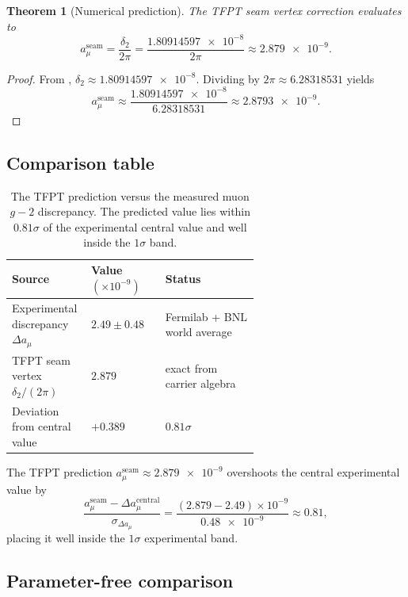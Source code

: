 \documentclass[11pt,a4paper]{article}
\newtheorem{theorem}{Theorem}[section]
\theoremstyle{definition}
\theoremstyle{remark}
\numberwithin{equation}{section}
\begin{document}
\begin{theorem}[Numerical prediction]\label{thm:numerical-prediction}
The TFPT seam vertex correction evaluates to
\begin{equation}\label{eq:numerical-prediction}
a_\mu^{\mathrm{seam}}
=
\frac{\delta_2}{2\pi}
=
\frac{\num{1.80914597e-8}}{2\pi}
\approx
\num{2.879e-9}.
\end{equation}
\end{theorem}

\begin{proof}
From , $\delta_2\approx\num{1.80914597e-8}$.
Dividing by $2\pi\approx\num{6.28318531}$ yields
\[
a_\mu^{\mathrm{seam}}
\approx
\frac{\num{1.80914597e-8}}{\num{6.28318531}}
\approx
\num{2.8793e-9}.
\]
\end{proof}

\subsection{Comparison table}

\begin{table}[ht]
\centering
\begin{tabularx}{\linewidth}{@{}>{\raggedright\arraybackslash}p{0.32\linewidth}
    >{\centering\arraybackslash}p{0.30\linewidth}
    >{\centering\arraybackslash}X@{}}
\toprule
Source & Value $(\times10^{-9})$ & Status \\
\midrule
Experimental discrepancy $\Delta a_\mu$ & $2.49\pm0.48$ & Fermilab + BNL world average \\
TFPT seam vertex $\delta_2/(2\pi)$ & $2.879$ & exact from carrier algebra \\
\midrule
Deviation from central value & $+0.389$ & $0.81\sigma$ \\
\bottomrule
\end{tabularx}
\caption{The TFPT prediction versus the measured muon $g-2$ discrepancy. The
predicted value lies within $0.81\sigma$ of the experimental central value and
well inside the $1\sigma$ band.}
\label{tab:comparison}
\end{table}

The TFPT prediction $a_\mu^{\mathrm{seam}}\approx\num{2.879e-9}$ overshoots
the central experimental value by
\[
\frac{a_\mu^{\mathrm{seam}}-\Delta a_\mu^{\mathrm{central}}}{\sigma_{\Delta a_\mu}}
=
\frac{(\num{2.879}-\num{2.49})\times10^{-9}}{\num{0.48e-9}}
\approx
0.81,
\]
placing it well inside the $1\sigma$ experimental band.

\subsection{Parameter-free comparison}
\end{document}

